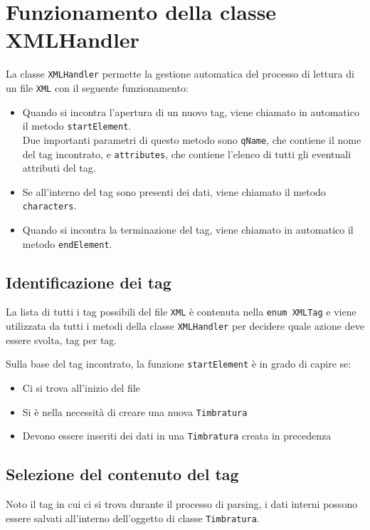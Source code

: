 \section{Funzionamento della classe XMLHandler}
La classe \verb|XMLHandler| permette la gestione automatica del processo di lettura di un file \verb|XML| con il seguente funzionamento:
\begin{itemize}
	\item Quando si incontra l'apertura di un nuovo tag, viene chiamato in automatico il metodo \verb|startElement|.\\
		Due importanti parametri di questo metodo sono \verb|qName|, che contiene il nome del tag incontrato, e \verb|attributes|, che contiene l'elenco di tutti gli eventuali attributi del tag.
	\item Se all'interno del tag sono presenti dei dati, viene chiamato il metodo \verb|characters|.
	\item Quando si incontra la terminazione del tag, viene chiamato in automatico il metodo \verb|endElement|.
\end{itemize}

\lstset{
    caption=Classe XMLHandler
 }

\subsection{Identificazione dei tag}
La lista di tutti i tag possibili del file \verb|XML| è contenuta nella \verb|enum XMLTag| e viene utilizzata da tutti i metodi della classe \verb|XMLHandler| per decidere quale azione deve essere svolta, tag per tag.
\lstset{
    caption=Enumerazione XMLTag
 }

Sulla base del tag incontrato, la funzione \verb|startElement| è in grado di capire se:
\begin{itemize}
	\item Ci si trova all'inizio del file
	\item Si è nella necessità di creare una nuova \verb|Timbratura|
	\item Devono essere inseriti dei dati in una \verb|Timbratura| creata in precedenza 	
\end{itemize}
\lstset{
    caption=Metodo startElement
 }

\subsection{Selezione del contenuto del tag}
Noto il tag in cui ci si trova durante il processo di parsing, i dati interni possono essere salvati all'interno dell'oggetto di classe \verb|Timbratura|.
\lstset{
    caption=Metodo characters
 }

